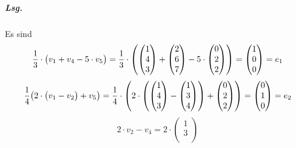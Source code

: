 \documentclass{scrreprt}
\begin{document}
\begin{enumerate}[(a)]
  \subparagraph{Lsg.} Es sind
  \[
    \frac{1}{3} \cdot \qty\big(v_1 + v_4 - 5 \cdot v_5) =
    \frac{1}{3} \cdot \qty(
    \begin{pmatrix}
      1 \\
      4 \\
      3 \\
    \end{pmatrix} +
    \begin{pmatrix}
      2 \\
      6 \\
      7 \\
    \end{pmatrix} - 5 \cdot
    \begin{pmatrix}
      0 \\
      2 \\
      2 \\
    \end{pmatrix})
    = \begin{pmatrix}
      1 \\
      0 \\
      0 \\
    \end{pmatrix} = e_1
  \]
  \[
    \frac{1}{4}\qty(2 \cdot \qty\big(v_1 - v_2) + v_5) = \frac{1}{4} \cdot \qty(2 \cdot \qty(
    \begin{pmatrix}
      1 \\
      4 \\
      3 \\
    \end{pmatrix} -
    \begin{pmatrix}
      1 \\
      3 \\
      4 \\
    \end{pmatrix}
    )
    +
    \begin{pmatrix}
      0 \\
      2 \\
      2 \\
    \end{pmatrix}
    ) = \begin{pmatrix}
      0 \\
      1 \\
      0 \\
    \end{pmatrix} = e_2
  \]
  \[
    2 \cdot v_2 - v_4 = 2 \cdot
    \begin{pmatrix}
      1 \\
      3 \\

\end{pmatrix}\]
\end{enumerate}
\end{document}
